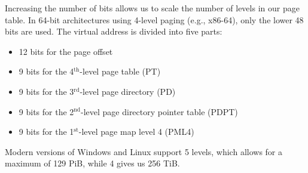 \begin{Def}

    Increasing the number of bits allows us to scale the number of levels in our page table.
    In 64-bit architectures using 4-level paging (e.g., x86-64), only the lower 48 bits are used. The virtual address is divided into five parts:
    \begin{itemize}
        \item 12 bits for the page offset
        \item 9 bits for the 4$^{\text{th}}$-level page table (PT)
        \item 9 bits for the 3$^{\text{rd}}$-level page directory (PD)
        \item 9 bits for the 2$^{\text{nd}}$-level page directory pointer table (PDPT)
        \item 9 bits for the 1$^{\text{st}}$-level page map level 4 (PML4)
    \end{itemize}
    \noindent
    Modern versions of Windows and Linux support 5 levels, which allows for a maximum of 129 PiB, while 4 gives us 256 TiB.
\end{Def}